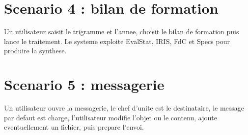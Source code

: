 \documentclass[11pt,a4paper]{report}
\begin{document}
\section{Scenario 4 : bilan de formation}

Un utilisateur saisit le trigramme et l'annee, choisit le bilan de formation puis lance le traitement. Le systeme exploite EvalStat, IRIS, FdC et Specs pour produire la synthese.

\section{Scenario 5 : messagerie}

Un utilisateur ouvre la messagerie, le chef d'unite est le destinataire, le message par defaut est charge, l'utilisateur modifie l'objet ou le contenu, ajoute eventuellement un fichier, puis prepare l'envoi.
\end{document}
